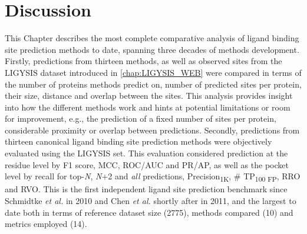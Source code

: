 \section{Discussion}

This Chapter describes the most complete comparative analysis of ligand binding site prediction methods to date, spanning three decades of methods development. Firstly, predictions from thirteen methods, as well as observed sites from the LIGYSIS dataset introduced in \autoref{chap:LIGYSIS_WEB} were compared in terms of the number of proteins methods predict on, number of predicted sites per protein, their size, distance and overlap between the sites. This analysis provides insight into how the different methods work and hints at potential limitations or room for improvement, e.g., the prediction of a fixed number of sites per protein, considerable proximity or overlap between predictions. Secondly, predictions from thirteen canonical ligand binding site prediction methods were objectively evaluated using the LIGYSIS set. This evaluation considered prediction at the residue level by F1 score, MCC, ROC/AUC and PR/AP, as well as the pocket level by recall for top-\textit{N}, \textit{N}+2 and \textit{all} predictions, Precision\textsubscript{1K}, \# TP\textsubscript{100 FP}, RRO and RVO. This is the first independent ligand site prediction benchmark since Schmidtke \textit{et al.} \cite{SCHMIDTKE_2010_BENCHMARK} in 2010 and Chen \textit{et al.} \cite{CHEN_2011_ASSESSMENT} shortly after in 2011, and the largest to date both in terms of reference dataset size (2775), methods compared (10) and metrics employed (14).

\newpage

